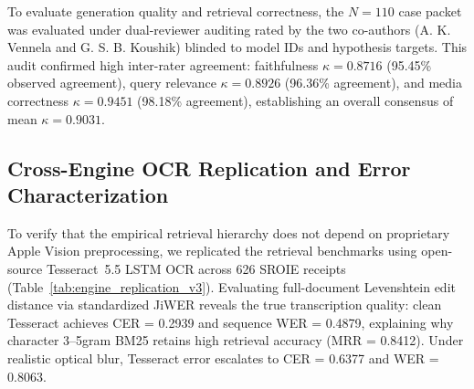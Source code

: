 \documentclass[conference]{IEEEtran}
\begin{document}
To evaluate generation quality and retrieval correctness, the $N=110$ case packet was evaluated under dual-reviewer auditing rated by the two co-authors (A. K. Vennela and G. S. B. Koushik) blinded to model IDs and hypothesis targets. This audit confirmed high inter-rater agreement: faithfulness $\kappa = 0.8716$ (95.45\% observed agreement), query relevance $\kappa = 0.8926$ (96.36\% agreement), and media correctness $\kappa = 0.9451$ (98.18\% agreement), establishing an overall consensus of mean $\kappa = 0.9031$.

\begin{table}[t]
\centering\small
\caption{Independent Extractive PRF vs.\ Generative LLM Multi-Hop Bridging across Diagnostic Multi-Hop ($N=50$) and Expanded ($N=100$) Suites.}\label{tab:multihop_v6}
\end{table}

\subsection{Cross-Engine OCR Replication and Error Characterization}
\label{sec:cross_engine_replication}

To verify that the empirical retrieval hierarchy does not depend on proprietary Apple Vision preprocessing, we replicated the retrieval benchmarks using open-source Tesseract~5.5 LSTM OCR across 626 SROIE receipts (Table~\ref{tab:engine_replication_v3}). Evaluating full-document Levenshtein edit distance via standardized JiWER \cite{schneider2024jiwer} reveals the true transcription quality: clean Tesseract achieves CER = 0.2939 and sequence WER = 0.4879, explaining why character 3--5gram BM25 retains high retrieval accuracy (MRR = 0.8412). Under realistic optical blur, Tesseract error escalates to CER = 0.6377 and WER = 0.8063.
\end{document}
